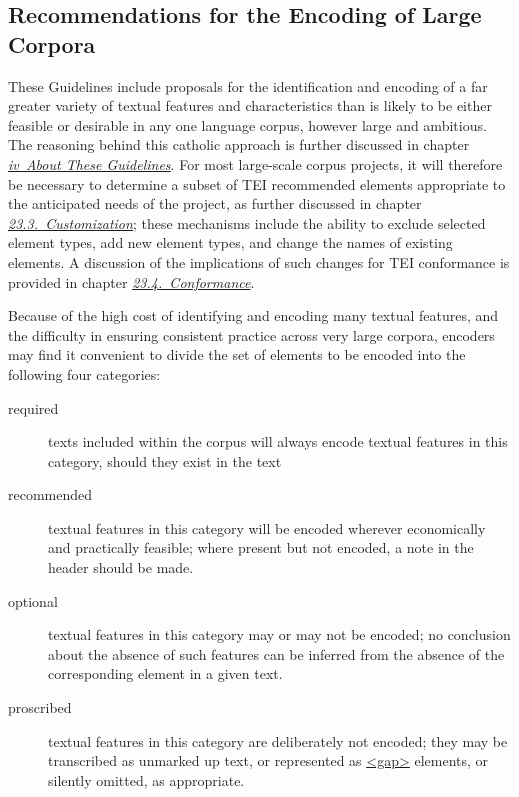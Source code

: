 \subsection[{Recommendations for the Encoding of Large Corpora}]{Recommendations for the Encoding of Large Corpora}\label{CCREC}\par
These Guidelines include proposals for the identification and encoding of a far greater variety of textual features and characteristics than is likely to be either feasible or desirable in any one language corpus, however large and ambitious. The reasoning behind this catholic approach is further discussed in chapter \textit{\hyperref[AB]{iv\ About These Guidelines}}. For most large-scale corpus projects, it will therefore be necessary to determine a subset of TEI recommended elements appropriate to the anticipated needs of the project, as further discussed in chapter \textit{\hyperref[MD]{23.3.\ Customization}}; these mechanisms include the ability to exclude selected element types, add new element types, and change the names of existing elements. A discussion of the implications of such changes for TEI conformance is provided in chapter \textit{\hyperref[CF]{23.4.\ Conformance}}.\par
Because of the high cost of identifying and encoding many textual features, and the difficulty in ensuring consistent practice across very large corpora, encoders may find it convenient to divide the set of elements to be encoded into the following four categories: \begin{description}

\item[{required}]texts included within the corpus will always encode textual features in this category, should they exist in the text
\item[{recommended}]textual features in this category will be encoded wherever economically and practically feasible; where present but not encoded, a note in the header should be made.
\item[{optional}]textual features in this category may or may not be encoded; no conclusion about the absence of such features can be inferred from the absence of the corresponding element in a given text.
\item[{proscribed}]textual features in this category are deliberately not encoded; they may be transcribed as unmarked up text, or represented as \hyperref[TEI.gap]{<gap>} elements, or silently omitted, as appropriate.
\end{description} 
